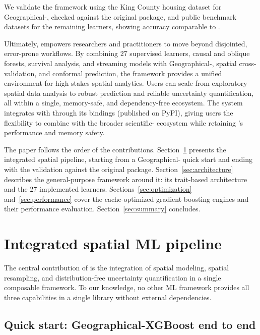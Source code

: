 \documentclass[article]{jss}
\begin{document}
We validate the framework using the King County housing dataset for
Geographical-, checked against the original 
package, and public benchmark datasets for the remaining learners, showing
accuracy comparable to .

Ultimately,  empowers researchers and practitioners to move
beyond disjointed, error-prone workflows. By combining 27 supervised learners,
causal and oblique forests, survival analysis, and streaming models with
Geographical-, spatial cross-validation, and conformal prediction,
the framework provides a unified environment for high-stakes spatial
analytics. Users can scale from exploratory spatial data analysis to robust
prediction and reliable uncertainty quantification, all within a single,
memory-safe, and dependency-free  ecosystem. The system
integrates with  through its  bindings (published
on PyPI), giving users the flexibility to combine  with the
broader scientific- ecosystem while retaining 's
performance and memory safety.

The paper follows the order of the contributions. Section~\ref{sec:spatial}
presents the integrated spatial pipeline, starting from a Geographical-
quick start and ending with the validation against the original package.
Section~\ref{sec:architecture} describes the general-purpose framework around
it: its trait-based architecture and the 27 implemented learners.
Sections~\ref{sec:optimization} and~\ref{sec:performance} cover the
cache-optimized gradient boosting engines and their performance evaluation.
Section~\ref{sec:summary} concludes.



\section{Integrated spatial ML pipeline} \label{sec:spatial}

The central contribution of  is the integration of spatial
modeling, spatial resampling, and distribution-free uncertainty quantification
in a single composable framework. To our knowledge, no other ML framework
provides all three capabilities in a single library without external
dependencies.

\subsection{Quick start: Geographical-XGBoost end to end}
\label{sec:geo_quickstart}
\end{document}
